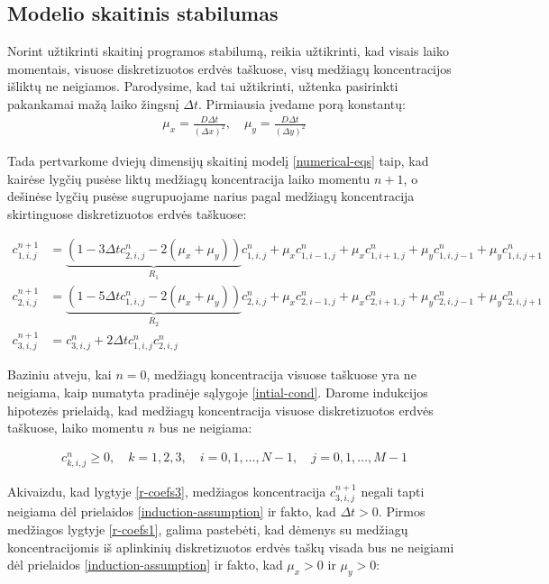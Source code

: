 \subsection{Modelio skaitinis stabilumas}

Norint užtikrinti skaitinį programos stabilumą, reikia užtikrinti, kad visais laiko momentais, visuose diskretizuotos erdvės taškuose, visų medžiagų koncentracijos išliktų ne neigiamos. Parodysime, kad tai užtikrinti, užtenka pasirinkti pakankamai mažą laiko žingsnį $\Delta t$. Pirmiausia įvedame porą konstantų:
\begin{align*}
\mu_x = \frac{D\Delta t}{(\Delta x)^2}, \quad
\mu_y = \frac{D\Delta t}{(\Delta y)^2}
\end{align*}

Tada pertvarkome dviejų dimensijų skaitinį modelį \eqref{numerical-eqs} taip, kad kairėse lygčių pusėse liktų medžiagų koncentracija laiko momentu $n+1$, o dešinėse lygčių pusėse sugrupuojame narius pagal medžiagų koncentracija skirtinguose diskretizuotos erdvės taškuose:

\begin{subequations} \label{eqs:r-coefs}
    \begin{align}
    c^{n+1}_{1,i,j}&=\underbrace{(1-3\Delta tc^{n}_{2,i,j}-2(\mu_x+\mu_y))}_{R_1}c^n_{1,i,j}+\mu_xc^n_{1,i-1,j}+\mu_xc^n_{1,i+1,j}+\mu_yc^n_{1,i,j-1}+\mu_yc^n_{1,i,j+1} \label{r-coefs1}\\
    c^{n+1}_{2,i,j}&=\underbrace{(1-5\Delta tc^{n}_{1,i,j}-2(\mu_x+\mu_y))}_{R_2}c^n_{2,i,j}+\mu_xc^n_{2,i-1,j}+\mu_xc^n_{2,i+1,j}+\mu_yc^n_{2,i,j-1}+\mu_yc^n_{2,i,j+1} \label{r-coefs2}\\
    c^{n+1}_{3,i,j}&=c^n_{3,i,j}+2\Delta tc^{n}_{1,i,j}c^{n}_{2,i,j} \label{r-coefs3}
    \end{align}
\end{subequations}

Baziniu atveju, kai $n=0$, medžiagų koncentracija visuose taškuose yra ne neigiama, kaip numatyta pradinėje sąlygoje \eqref{intial-cond}. Darome indukcijos hipotezės prielaidą, kad medžiagų koncentracija visuose diskretizuotos erdvės taškuose, laiko momentu $n$ bus ne neigiama:

\begin{align} \label{induction-assumption}
    c^n_{k,i,j} \geqslant 0, \quad k=1,2,3,\quad i=0,1,\dots,N-1,\quad j=0,1,\dots,M-1
\end{align}

Akivaizdu, kad lygtyje \eqref{r-coefs3}, medžiagos koncentracija $c^{n+1}_{3,i,j}$ negali tapti neigiama dėl prielaidos \eqref{induction-assumption} ir fakto, kad $\Delta t>0$. Pirmos medžiagos lygtyje \eqref{r-coefs1}, galima pastebėti, kad dėmenys su medžiagų koncentracijomis iš aplinkinių diskretizuotos erdvės taškų visada bus ne neigiami dėl prielaidos \eqref{induction-assumption} ir fakto, kad $\mu_x>0$ ir $\mu_y>0$:

